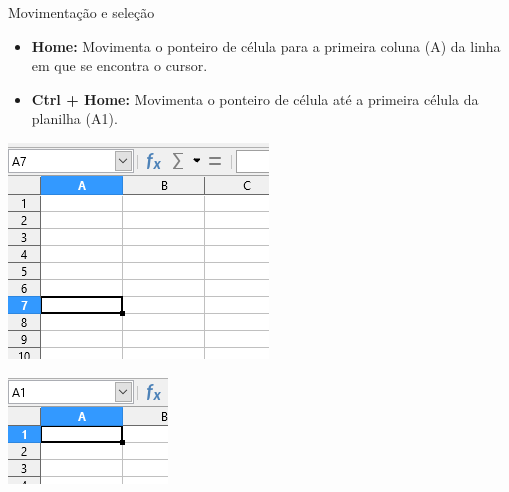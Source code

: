 \begin{frame}{Movimentação e seleção}
	\begin{block}{}
		\begin{itemize}
			\item \textbf{Home:}
			Movimenta o ponteiro de célula para a primeira coluna (A) da linha em que se encontra o cursor.
			\item \textbf{Ctrl + Home:}
			Movimenta o ponteiro de célula até a primeira célula da planilha (A1).
		\end{itemize}
	\end{block}
	
	\begin{minipage}{0.49\linewidth}
		\centering
		\includegraphics[width=1\linewidth]{Figuras/Ch06/fig10}
	\end{minipage}\hfill
	\begin{minipage}{0.49\linewidth}
		\centering
		\includegraphics[width=1\linewidth]{Figuras/Ch06/fig11}
	\end{minipage}
\end{frame}


